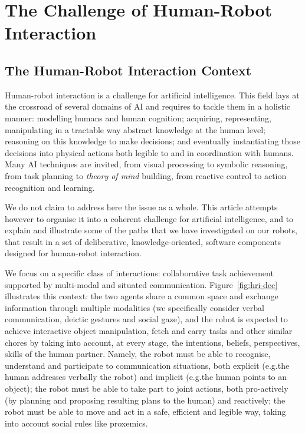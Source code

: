\documentclass[preprint,3p,times]{elsarticle}
\newcommand{\eg}{{e.g.\xspace}}
\begin{document}

\section{The Challenge of Human-Robot Interaction}

\subsection{The Human-Robot Interaction Context}

Human-robot interaction is a challenge for artificial intelligence. This field
lays at the crossroad of several domains of AI and requires to tackle them in a
holistic manner: modelling humans and human cognition; acquiring, representing,
manipulating in a tractable way abstract knowledge at the human level; reasoning
on this knowledge to make decisions; and eventually instantiating those
decisions into physical actions both legible to and in coordination with humans.
Many AI techniques are invited, from visual processing to symbolic reasoning,
from task planning to \emph{theory of mind} building, from reactive control to
action recognition and learning.

We do not claim to address here the issue as a whole. This article attempts
however to organise it into a coherent challenge for artificial intelligence,
and to explain and illustrate some of the paths that we have investigated on our
robots, that result in a set of deliberative, knowledge-oriented, software
components designed for human-robot interaction.

We focus on a specific class of interactions: collaborative task achievement
supported by multi-modal and situated communication. Figure~\ref{fig:hri-dec}
illustrates this context: the two agents share a common space and exchange
information through multiple modalities (we specifically consider verbal
communication, deictic gestures and social gaze), and the robot is expected to achieve
interactive object manipulation, fetch and carry tasks and other similar
chores by taking into account, at every stage, the intentions, beliefs,
perspectives, skills of the human partner.  Namely, the robot must be able to
recognise, understand and participate to communication situations, both explicit
(\eg the human addresses verbally the robot) and implicit (\eg the human points
to an object); the robot must be able to take part to joint actions, both
pro-actively (by planning and proposing resulting plans to the human) and
reactively; the robot must be able to move and act in a safe, efficient and
legible way, taking into account social rules like proxemics.
\end{document}
